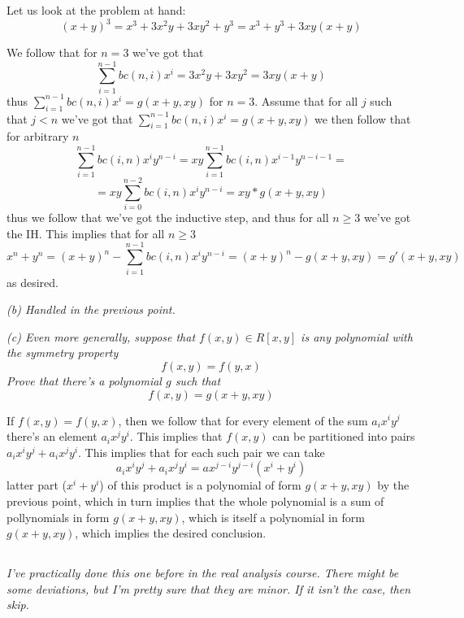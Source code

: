 \documentclass[11pt,oneside,titlepage]{book}
\begin{document}
Let us look at the problem at hand:
$$(x + y)^3 = x^3 + 3x^2y + 3xy^2 + y^3 = x^3 + y^3 + 3xy(x + y)$$

We follow that for $n = 3$ we've got that
$$\sum_{i = 1}^{n - 1}{bc(n, i) x^i} = 3x^2y + 3xy^2 = 3xy(x + y)$$
thus $\sum_{i = 1}^{n - 1}{bc(n, i) x^i} = g(x + y, xy)$ for $n = 3$.
Assume that for all $j$ such that $j < n$ we've got that $\sum_{i =
1}^{n - 1}{bc(n, i) x^i} = g(x + y, xy)$
we then follow that for arbitrary $n$
$$ \sum_{i = 1}^{n - 1} {bc(i, n)x^iy^{n - i}} =
xy \sum_{i = 1}^{n - 1} {bc(i, n)x^{i - 1}y^{n - i - 1}} = $$
$$ = xy \sum_{i = 0}^{n - 2} {bc(i, n)x^{i}y^{n - i}}  = xy * g(x + y, xy)$$
thus we follow that we've got the inductive step, and thus for all $n
\geq 3$ we've got the IH. This implies that for all $n \geq 3$
$$x^n + y^n = (x + y)^n -  \sum_{i = 1}^{n - 1} {bc(i, n)x^iy^{n - i}} =
(x + y)^n - g(x + y, xy) = g'(x + y, xy)$$
as desired.

\textit{(b) Handled in the previous point.}

\textit{(c) Even more generally, suppose that $f(x, y) \in R[x, y]$ is any polynomial
  with the symmetry property
  $$f(x, y) = f(y, x)$$
  Prove that there's a polynomial $g$ such that
  $$f(x, y) = g(x + y, xy)$$}

If $f(x, y) = f(y, x)$, then we follow that for every element of the
sum $a_i x^i y^j$ there's an element $a_i x^j y^i$. This implies that
$f(x, y)$ can be partitioned into pairs $a_i x^i y^j + a_i x^j
y^i$. This implies that for each such pair we can take
$$a_i x^i y^j + a_i x^j y^i = a x^{j - i}y^{j - i}(x^i + y^i)$$
latter part ($x^i + y^i$) of this product is a polynomial of form $g(x
+ y, xy)$ by the previous point, which in turn implies that the whole
polynomial is a sum of pollynomials in form $g(x + y, xy)$, which is
itself a polynomial in form $g(x + y, xy)$, which implies the desired
conclusion.

\subsection{}

\textit{I've practically done this one before in the real analysis
  course. There might be some deviations, but I'm pretty sure that they
  are minor.  If it isn't the case, then skip.}

\subsection{}
\end{document}
